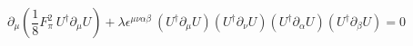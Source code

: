 \begin{equation}
\partial_\mu (\frac{1}{8} F_\pi^2~U^\dag \partial_\mu U)+ \lambda \epsilon^{\mu\nu\alpha\beta}~ (U^\dag \partial_\mu U) (U^\dag \partial_\nu U) (U^\dag \partial_\alpha U) (U^\dag \partial_\beta U)=0 
\end{equation}

